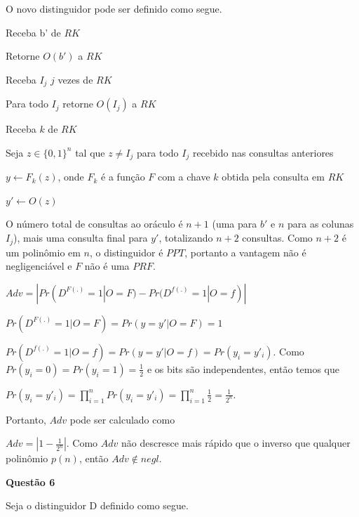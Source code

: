\documentclass{article}
\begin{document}
        O novo distinguidor pode ser definido como segue.

        \begin{algorithm}[H]
            \caption{Distinguidor $D$}

            Receba b' de $RK$

            Retorne $O(b')$ a $RK$

            Receba $I_j$ $j$ vezes de $RK$ 

            Para todo $I_j$ retorne $O(I_j)$ a $RK$

            Receba $k$ de $RK$

            Seja $z \in \{0,1\}^n$ tal que $z \neq I_j$ para todo $I_j$ recebido nas consultas anteriores
            
            $y \leftarrow F_k(z)$, onde $F_k$ é a função $F$ com a chave $k$ obtida pela consulta em $RK$
            
            $y' \leftarrow O(z)$

        \end{algorithm}

        O número total de consultas ao oráculo é $n+1$ (uma para $b'$ e $n$ para as colunas $I_j$), mais uma consulta final para $y'$, totalizando $n+2$ consultas. Como $n+2$ é um polinômio em $n$, o distinguidor é $PPT$, portanto a vantagem não é negligenciável e $F$ não é uma $PRF$.

        $Adv = |Pr(D^{F(.)} = 1 | O = F) - Pr(D^{f(.)} = 1 | O = f)|$

        $Pr(D^{F(.)} = 1 | O = F) = Pr(y = y'| O = F) = 1$

        $Pr(D^{f(.)} = 1 | O = f) = Pr(y = y' | O = f) = Pr(y_i = y'_i)$. Como $Pr(y_i = 0) = Pr(y_i = 1) = \frac{1}{2}$ e os bits são independentes, então temos que

        $Pr(y_i = y'_i) = \prod_{i = 1}^{n} Pr(y_i = y'_i) = \prod_{i = 1}^{n} \frac{1}{2} = \frac{1}{2^n}$.

        Portanto, $Adv$ pode ser calculado como

        $Adv = |1 - \frac{1}{2^n}|$. Como $Adv$ não descresce mais rápido que o inverso que qualquer polinômio $p(n)$, então $Adv \notin negl$.

\textbf{Questão 6}
    
    Seja o distinguidor D definido como segue.
\end{document}
